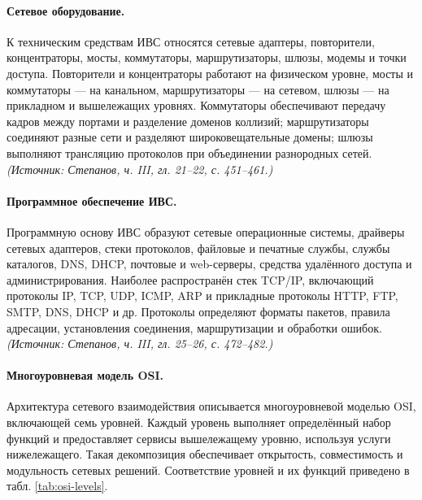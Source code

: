 \documentclass[a4paper,12pt]{article}
\begin{document}
\paragraph{Сетевое оборудование.}
К техническим средствам ИВС относятся сетевые адаптеры, повторители, концентраторы, мосты, коммутаторы, маршрутизаторы, шлюзы, модемы и точки доступа. Повторители и концентраторы работают на физическом уровне, мосты и коммутаторы — на канальном, маршрутизаторы — на сетевом, шлюзы — на прикладном и вышележащих уровнях. Коммутаторы обеспечивают передачу кадров между портами и разделение доменов коллизий; маршрутизаторы соединяют разные сети и разделяют широковещательные домены; шлюзы выполняют трансляцию протоколов при объединении разнородных сетей.
\textit{(Источник: Степанов, ч. III, гл. 21–22, с. 451–461.)}

\paragraph{Программное обеспечение ИВС.}
Программную основу ИВС образуют сетевые операционные системы, драйверы сетевых адаптеров, стеки протоколов, файловые и печатные службы, службы каталогов, DNS, DHCP, почтовые и web-серверы, средства удалённого доступа и администрирования. Наиболее распространён стек TCP/IP, включающий протоколы IP, TCP, UDP, ICMP, ARP и прикладные протоколы HTTP, FTP, SMTP, DNS, DHCP и др. Протоколы определяют форматы пакетов, правила адресации, установления соединения, маршрутизации и обработки ошибок.
\textit{(Источник: Степанов, ч. III, гл. 25–26, с. 472–482.)}

\paragraph{Многоуровневая модель OSI.}
Архитектура сетевого взаимодействия описывается многоуровневой моделью OSI, включающей семь уровней. Каждый уровень выполняет определённый набор функций и предоставляет сервисы вышележащему уровню, используя услуги нижележащего. Такая декомпозиция обеспечивает открытость, совместимость и модульность сетевых решений. Соответствие уровней и их функций приведено в табл. \ref{tab:osi-levels}.
\end{document}
